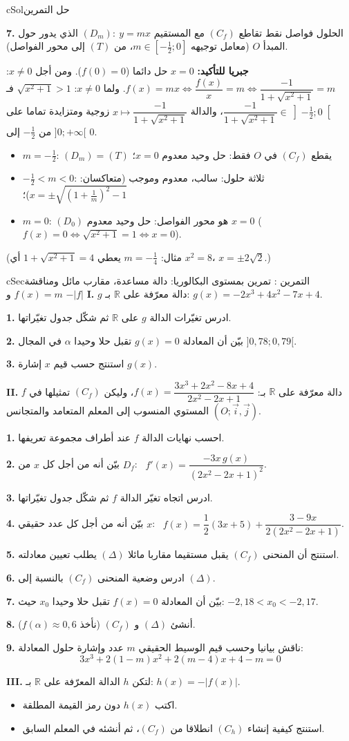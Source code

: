 \documentclass[12pt,a4paper]{article}
\newenvironment{BOX}[2]{\begin{otherlanguage}{english}\begin{arbox}{#1}{#2}}{\end{arbox}\end{otherlanguage}}
\newcounter{exo}
\newenvironment{tamrin}[1]{\stepcounter{exo}\begin{BOX}{cSec}{التمرين \theexo: #1}}{\end{BOX}}
\newenvironment{hal}{\Needspace{12\baselineskip}\begin{otherlanguage}{english}\begin{arbox}[breakable]{cSol}{حل التمرين \theexo}}{\end{arbox}\end{otherlanguage}}
\newcommand{\R}{\mathbb{R}}
\newcommand{\QQ}[1]{\par\smallskip\textbf{#1.} }
\begin{document}
\begin{hal}
\QQ{7} الحلول فواصل نقط تقاطع $(C_f)$ مع المستقيم $(D_m):\ y=mx$ الذي يدور حول المبدأ $O$ (معامل توجيهه $m\in\left[-\tfrac12;0\right]$، من $(T)$ إلى محور الفواصل).

\textbf{جبريا للتأكيد:} $x=0$ حل دائما ($f(0)=0$). ومن أجل $x\neq0$: $f(x)=mx\iff\dfrac{f(x)}{x}=m\iff\dfrac{-1}{1+\sqrt{x^{2}+1}}=m$. ولما $x\neq0$: $\sqrt{x^{2}+1}>1$ فـ $\dfrac{-1}{1+\sqrt{x^{2}+1}}\in\left]-\tfrac12;0\right[$، والدالة $x\mapsto\dfrac{-1}{1+\sqrt{x^{2}+1}}$ زوجية ومتزايدة تماما على $]0;+\infty[$ من $-\tfrac12$ إلى $0$.
\begin{itemize}
\item $m=-\tfrac12$: $(D_m)=(T)$ يقطع $(C_f)$ في $O$ فقط: حل وحيد معدوم $x=0$؛
\item $-\tfrac12<m<0$: ثلاثة حلول: سالب، معدوم وموجب (متعاكسان: $x=\pm\sqrt{\left(1+\tfrac1m\right)^{2}-1}$)؛
\item $m=0$: $(D_0)$ هو محور الفواصل: حل وحيد معدوم $x=0$ ($f(x)=0\iff\sqrt{x^{2}+1}=1\iff x=0$).
\end{itemize}
(مثال: $m=-\tfrac14$ يعطي $1+\sqrt{x^{2}+1}=4$ أي $x^{2}=8$، $x=\pm2\sqrt2$.)
\end{hal}

\begin{tamrin}{تمرين بمستوى البكالوريا: دالة مساعدة، مقارب مائل ومناقشة $f(x)=m$ و $-|f|$}
\textbf{I.} $g$ دالة معرّفة على $\R$ بـ: $g(x)=-2x^{3}+4x^{2}-7x+4$.
\QQ{1} ادرس تغيّرات الدالة $g$ على $\R$ ثم شكّل جدول تغيّراتها.
\QQ{2} بيّن أن المعادلة $g(x)=0$ تقبل حلا وحيدا $\alpha$ في المجال $]0{,}78;0{,}79[$.
\QQ{3} استنتج حسب قيم $x$ إشارة $g(x)$.

\textbf{II.} $f$ دالة معرّفة على $\R$ بـ: $f(x)=\dfrac{3x^{3}+2x^{2}-8x+4}{2x^{2}-2x+1}$، وليكن $(C_f)$ تمثيلها في المستوي المنسوب إلى المعلم المتعامد والمتجانس $(O;\vec i,\vec j)$.
\QQ{1} احسب نهايات الدالة $f$ عند أطراف مجموعة تعريفها.
\QQ{2} بيّن أنه من أجل كل $x$ من $D_f$: \ $f'(x)=\dfrac{-3x\,g(x)}{(2x^{2}-2x+1)^{2}}$.
\QQ{3} ادرس اتجاه تغيّر الدالة $f$ ثم شكّل جدول تغيّراتها.
\QQ{4} بيّن أنه من أجل كل عدد حقيقي $x$: \ $f(x)=\dfrac12(3x+5)+\dfrac{3-9x}{2\left(2x^{2}-2x+1\right)}$.
\QQ{5} استنتج أن المنحنى $(C_f)$ يقبل مستقيما مقاربا مائلا $(\Delta)$ يطلب تعيين معادلته.
\QQ{6} ادرس وضعية المنحنى $(C_f)$ بالنسبة إلى $(\Delta)$.
\QQ{7} بيّن أن المعادلة $f(x)=0$ تقبل حلا وحيدا $x_0$ حيث: $-2{,}18<x_0<-2{,}17$.
\QQ{8} أنشئ $(\Delta)$ و $(C_f)$ (نأخذ $f(\alpha)\approx0{,}6$).
\QQ{9} ناقش بيانيا وحسب قيم الوسيط الحقيقي $m$ عدد وإشارة حلول المعادلة: \[3x^{3}+2(1-m)x^{2}+2(m-4)x+4-m=0\]

\textbf{III.} لتكن $h$ الدالة المعرّفة على $\R$ بـ: $h(x)=-|f(x)|$.
\begin{itemize}[label=$\spadesuit$]
\item اكتب $h(x)$ دون رمز القيمة المطلقة.
\item استنتج كيفية إنشاء $(C_h)$ انطلاقا من $(C_f)$، ثم أنشئه في المعلم السابق.
\end{itemize}
\end{tamrin}
\end{document}
